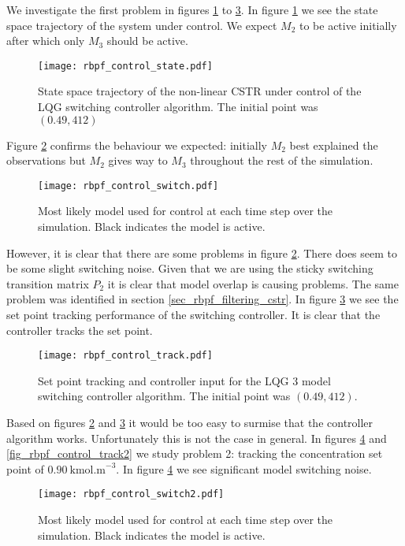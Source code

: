We investigate the first problem in figures \ref{fig_rbpf_control_state} to \ref{fig_rbpf_control_track}. In figure \ref{fig_rbpf_control_state} we see the state space trajectory of the system under control. We expect $M_2$ to be active initially after which only $M_3$ should be active.
\begin{figure}[H] 
\centering
\texttt{[image: rbpf\_control\_state.pdf]}
\caption{State space trajectory of the non-linear CSTR under control of the LQG switching controller algorithm. The initial point was $(0.49, 412)$}
\label{fig_rbpf_control_state}
\end{figure}
Figure \ref{fig_rbpf_control_switch} confirms the behaviour we expected: initially $M_2$ best explained the observations but $M_2$ gives way to $M_3$ throughout the rest of the simulation.   
\begin{figure}[H] 
\centering
\texttt{[image: rbpf\_control\_switch.pdf]}
\caption{Most likely model used for control at each time step over the simulation. Black indicates the model is active.}
\label{fig_rbpf_control_switch}
\end{figure}
However, it is clear that there are some problems in figure \ref{fig_rbpf_control_switch}. There does seem to be some slight switching noise. Given that we are using the sticky switching transition matrix $P_2$ it is clear that model overlap is causing problems. The same problem was identified in section \ref{sec_rbpf_filtering_cstr}. In figure \ref{fig_rbpf_control_track} we see the set point tracking performance of the switching controller. It is clear that the controller tracks the set point.
\begin{figure}[H] 
\centering
\texttt{[image: rbpf\_control\_track.pdf]}
\caption{Set point tracking and controller input for the LQG 3 model switching controller algorithm. The initial point was $(0.49, 412)$.}
\label{fig_rbpf_control_track}
\end{figure}
Based on figures \ref{fig_rbpf_control_switch} and \ref{fig_rbpf_control_track} it would be too easy to surmise that the controller algorithm works. Unfortunately this is not the case in general. In figures \ref{fig_rbpf_control_switch2} and \ref{fig_rbpf_control_track2} we study problem 2: tracking the concentration set point of $0.90~\text{kmol.m}^{-3}$. In figure \ref{fig_rbpf_control_switch2} we see significant model switching noise.
\begin{figure}[H] 
\centering
\texttt{[image: rbpf\_control\_switch2.pdf]}
\caption{Most likely model used for control at each time step over the simulation. Black indicates the model is active.}
\label{fig_rbpf_control_switch2}
\end{figure}
